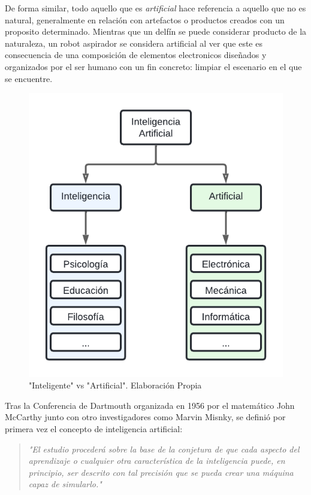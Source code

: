 De forma similar, todo aquello que es \emph{artificial} hace referencia a
aquello que no es natural, generalmente en relación con artefactos o productos
creados con un proposito determinado. Mientras que un delfín se puede considerar
producto de la naturaleza, un robot aspirador se considera artificial al ver que
este es consecuencia de una composición de elementos electronicos diseñados y
organizados por el ser humano con un fin concreto: limpiar el escenario en el
que se encuentre.

\begin{figure}[t]
    \centering
    \includegraphics[scale=0.8, trim=0.5cm 0.5cm 0.5cm 0.5cm]{figs/artificial-vs-intelligence.png}
    \caption{\small"Inteligente" vs "Artificial". Elaboración Propia}
    \label{fig:etiqueta}
\end{figure}

Tras la Conferencia de Dartmouth organizada en 1956 por el matemático John McCarthy
junto con otro investigadores como Marvin Misnky, se definió por primera vez el 
concepto de inteligencia artificial:

\begin{quote}
    \textit{
        "El estudio procederá sobre la base de la conjetura de que cada aspecto
        del aprendizaje o cualquier otra característica de la inteligencia
        puede, en principio, ser descrito con tal precisión que se pueda crear
        una máquina capaz de simularlo." \citet{mccarthy2006proposal}
    }
\end{quote}

